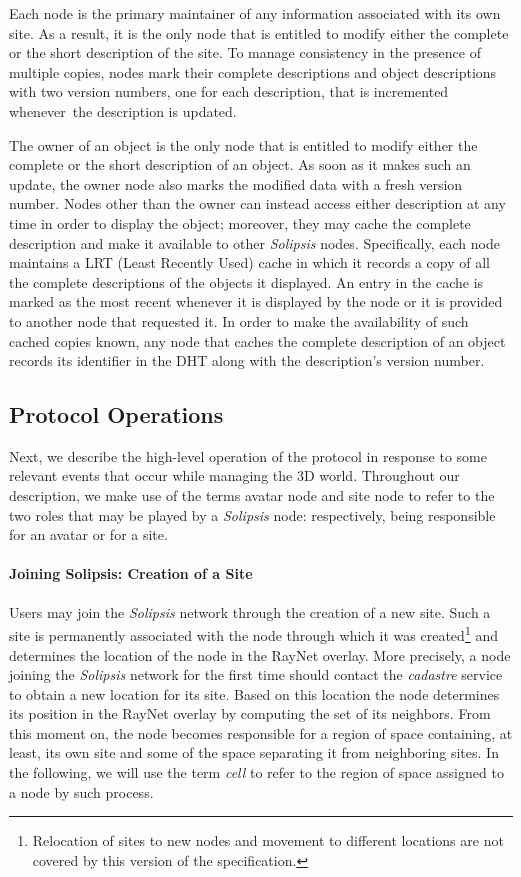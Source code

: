 \documentclass{article}
\newcommand{\sol}{\emph{Solipsis}\xspace}
\begin{document}
Each node is the primary maintainer of any information associated with
its own site.  As a result, it is the only node that is entitled to
modify either the complete or the short description of the site. To
manage consistency in the presence of multiple copies, nodes mark
their complete descriptions and object descriptions with two version
numbers, one for each description, that is incremented whenever\ the
description is updated.


The owner of an object is the only node that is entitled to modify
either the complete or the short description of an object. As soon as
it makes such an update, the owner node also marks the modified data
with a fresh version number.  Nodes other than the owner can instead
access either description at any time in order to display the object;
moreover, they may cache the complete description and make it
available to other \sol nodes. Specifically, each node maintains a LRT
(Least Recently Used) cache in which it records a copy of all the
complete descriptions of the objects it displayed. An entry in the
cache is marked as the most recent whenever it is displayed by the
node or it is provided to another node that requested it. In order to
make the availability of such cached copies known, any node that
caches the complete description of an object records its identifier in
the DHT along with the description's version number.



\subsection{Protocol Operations}
\newcommand{\anode}{avatar node\xspace}
\newcommand{\snode}{site node\xspace}
Next, we describe the high-level operation of the protocol in response
to some relevant events that occur while managing the 3D world.
Throughout our description, we make use of the terms \anode and \snode
to refer to the two roles that may be played by a \sol node:
respectively,  being responsible for an avatar or for a site.

\paragraph{Joining Solipsis: Creation of a Site}
Users may join the \sol network through the creation of a new
site. Such a site is permanently associated with the node through
which it was created\footnote{Relocation of sites to new nodes and
  movement to different locations are not covered by this version of
  the specification.} and determines the location of the node in the
RayNet overlay. More precisely, a node joining the \sol network for
the first time should contact the \emph{cadastre} service to obtain a
new location for its site. Based on this location the node determines
its position in the RayNet overlay by computing the set of its
neighbors. From this moment on, the node becomes responsible for a
region of space containing, at least, its own site and some of the
space separating it from neighboring sites. In the following, we will
use the term \emph{cell} to refer to the region of space assigned to a
node by such process.
\end{document}
